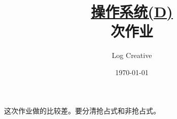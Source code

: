 \documentclass[12pt,a4paper]{article}
\newenvironment{problems}{\begin{list}{}{\renewcommand{\makelabel}[1]{\textbf{##1}\hfil}}}{\end{list}}
\newenvironment{steps}{\begin{list}{}{\renewcommand{\makelabel}[1]{##1.\hfil}}}{\end{list}}
\providecommand{\sol}{\textbf{解}.~}
\newcommand{\allpart}{20}
\providecommand{\blk}[2]{\framebox[\fpeval{round(#2/\allpart*\textwidth*0.8,2)}pt]{$P_#1$}}
\begin{document}
\title{\normalsize \underline{操作系统(D)}\\ 次作业}
\author{Log Creative }
\date{\today}
\maketitle

这次作业做的比较差。要分清抢占式和非抢占式。





             
\end{document}
